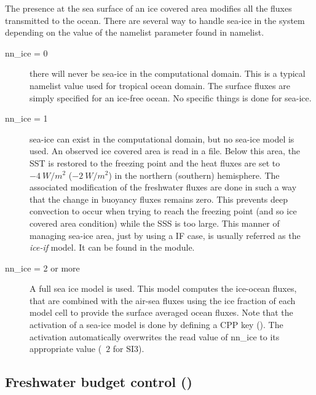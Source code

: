 \documentclass[../main/NEMO_manual]{subfiles}
\begin{document}
The presence at the sea surface of an ice covered area modifies all the fluxes transmitted to the ocean.
There are several way to handle sea-ice in the system depending on
the value of the  namelist parameter found in  namelist.
\begin{description}
\item [nn\_ice = 0] there will never be sea-ice in the computational domain.
  This is a typical namelist value used for tropical ocean domain.
  The surface fluxes are simply specified for an ice-free ocean.
  No specific things is done for sea-ice.
\item [nn\_ice = 1] sea-ice can exist in the computational domain, but no sea-ice model is used.
  An observed ice covered area is read in a file.
  Below this area, the SST is restored to the freezing point and
  the heat fluxes are set to $-4~W/m^2$ ($-2~W/m^2$) in the northern (southern) hemisphere.
  The associated modification of the freshwater fluxes are done in such a way that
  the change in buoyancy fluxes remains zero.
  This prevents deep convection to occur when trying to reach the freezing point
  (and so ice covered area condition) while the SSS is too large.
  This manner of managing sea-ice area, just by using a IF case,
  is usually referred as the \textit{ice-if} model.
  It can be found in the  module.
\item [nn\_ice = 2 or more] A full sea ice model is used.
  This model computes the ice-ocean fluxes,
  that are combined with the air-sea fluxes using the ice fraction of each model cell to
  provide the surface averaged ocean fluxes.
  Note that the activation of a sea-ice model is done by defining a CPP key ().
  The activation automatically overwrites the read value of nn\_ice to its appropriate value
  (\ie\ $2$ for SI3).
\end{description}

\subsection[Freshwater budget control (\textit{sbcfwb.F90})]{Freshwater budget control (\protect{})}
\label{subsec:SBC_fwb}

\begin{listing}
  \caption{}
  \label{lst:namsbc_fwb}
\end{listing}
\end{document}
